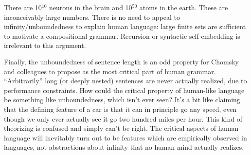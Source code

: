 \documentclass[output=paper]{langscibook}
\begin{document}
There are 10$^{10}$ neurons in the brain and 10$^{50}$ atoms in the earth. These are inconceivably large numbers. There is no need to appeal to infinity\slash unboundedness to explain human language: large finite sets are sufficient to motivate a compositional grammar. Recursion or syntactic self-embedding is irrelevant to this argument.

Finally, the unboundedness of sentence length is an odd property for Chomsky and colleagues to propose as the most critical part of human grammar.  ``Arbitrarily'' long (or deeply nested) sentences are never actually realized, due to performance constraints. How could the critical property of human-like language be something like unboundedness, which isn’t ever seen? It's a bit like claiming that the defining feature of a car is that it can in principle go any speed, even though we only ever actually see it go two hundred miles per hour. This kind of theorizing is confused and simply can't be right. The critical aspects of human language will inevitably turn out to be features which are empirically observed in languages, not abstractions about infinity that no human mind actually realizes.

\printbibliography[heading=subbibliography,notkeyword=this]
\end{document}
